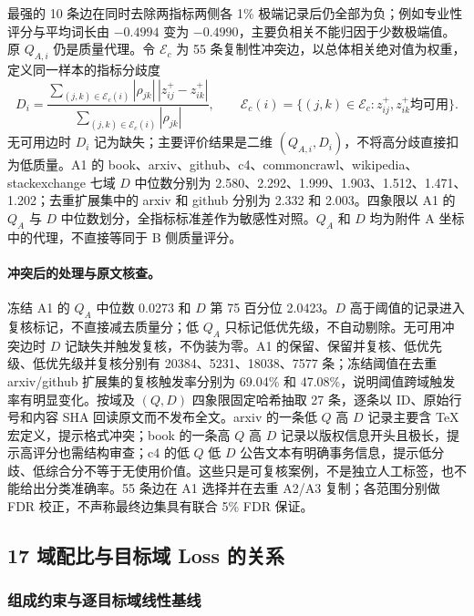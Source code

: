 最强的 10 条边在同时去除两指标两侧各 1\% 极端记录后仍全部为负；例如专业性评分与平均词长由 $-0.4994$ 变为 $-0.4990$，主要负相关不能归因于少数极端值。原 $Q_{A,i}$ 仍是质量代理。令 $\mathcal E_c$ 为 55 条复制性冲突边，以总体相关绝对值为权重，定义同一样本的指标分歧度
\begin{equation}
D_i=\frac{\sum_{(j,k)\in\mathcal E_c(i)}|\rho_{jk}|\,|z^+_{ij}-z^+_{ik}|}{\sum_{(j,k)\in\mathcal E_c(i)}|\rho_{jk}|},
\qquad \mathcal E_c(i)=\{(j,k)\in\mathcal E_c:z^+_{ij},z^+_{ik}\text{均可用}\}.
\end{equation}
无可用边时 $D_i$ 记为缺失；主要评价结果是二维 $(Q_{A,i},D_i)$，不将高分歧直接扣为低质量。A1 的 book、arxiv、github、c4、commoncrawl、wikipedia、stackexchange 七域 $D$ 中位数分别为 2.580、2.292、1.999、1.903、1.512、1.471、1.202；去重扩展集中的 arxiv 和 github 分别为 2.332 和 2.003。四象限以 A1 的 $Q_A$ 与 $D$ 中位数划分，全指标标准差作为敏感性对照。$Q_A$ 和 $D$ 均为附件 A 坐标中的代理，不直接等同于 B 侧质量评分。

\paragraph{冲突后的处理与原文核查。} 冻结 A1 的 $Q_A$ 中位数 0.0273 和 $D$ 第 75 百分位 2.0423。$D$ 高于阈值的记录进入复核标记，不直接减去质量分；低 $Q_A$ 只标记低优先级，不自动剔除。无可用冲突边时 $D$ 记缺失并触发复核，不伪装为零。A1 的保留、保留并复核、低优先级、低优先级并复核分别有 20384、5231、18038、7577 条；冻结阈值在去重 arxiv/github 扩展集的复核触发率分别为 69.04\% 和 47.08\%，说明阈值跨域触发率有明显变化。按域及 $(Q,D)$ 四象限固定哈希抽取 27 条，逐条以 ID、原始行号和内容 SHA 回读原文而不发布全文。arxiv 的一条低 $Q$ 高 $D$ 记录主要含 \TeX{} 宏定义，提示格式冲突；book 的一条高 $Q$ 高 $D$ 记录以版权信息开头且极长，提示高评分也需结构审查；c4 的低 $Q$ 低 $D$ 公告文本有明确事务信息，提示低分歧、低综合分不等于无使用价值。这些只是可复核案例，不是独立人工标签，也不能给出分类准确率。55 条边在 A1 选择并在去重 A2/A3 复制；各范围分别做 FDR 校正，不声称最终边集具有联合 5\% FDR 保证。

\subsection{17 域配比与目标域 Loss 的关系}

\subsubsection{组成约束与逐目标域线性基线}

